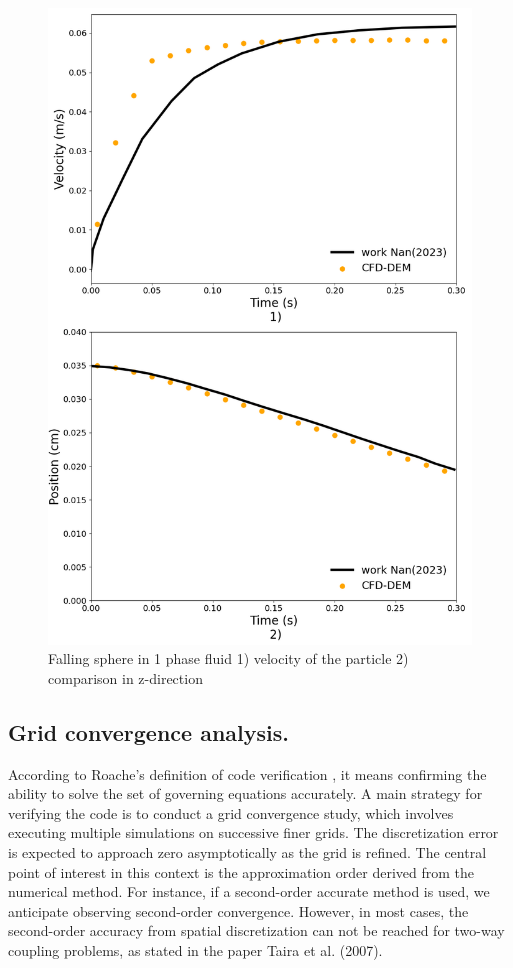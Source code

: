 \begin{figure}[!h]
    \centering
    \includegraphics[width=13cm]{Images/chap3/nan_simulation_192000_cells_dt_0_0005_simulation.png}
    \caption{Falling sphere in 1 phase fluid 1) velocity of the particle 2) comparison in z-direction}
    \label{fig:trajectory_1ph}
\end{figure}

\newpage

\subsection{Grid convergence analysis.}

According to Roache's definition of code verification \cite{roache1998verification}, it means confirming the ability to solve the set of governing equations accurately. A main strategy for verifying the code is to conduct a grid convergence study, which involves executing multiple simulations on successive finer grids. The discretization error is expected to approach zero asymptotically as the grid is refined. The central point of interest in this context is the approximation order derived from the numerical method. For instance, if a second-order accurate method is used, we anticipate observing second-order convergence. However, in most cases, the second-order accuracy from spatial discretization can not be reached for two-way coupling problems, as stated in the paper Taira et al. (2007)\cite{taira2007immersed}.

